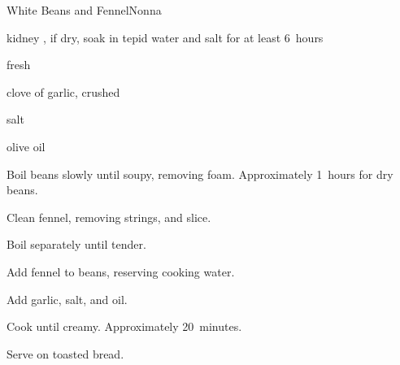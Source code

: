 \begin{recipe}{White Beans and Fennel}{Nonna}{}

\begin{ingredients}
\item kidney , if dry, soak in tepid water and salt for at least 6~hours
\item fresh 
\item clove of garlic, crushed
\item salt
\item olive oil
\end{ingredients}

\begin{directions}
\item Boil beans slowly until soupy, removing foam. Approximately 1\half~hours for dry beans.
\item Clean fennel, removing strings, and slice.
\item Boil separately until tender.
\item Add fennel to beans, reserving cooking water.
\item Add garlic, salt, and oil.
\item Cook until creamy. Approximately 20~minutes.
\item Serve on toasted bread.
\end{directions}

\end{recipe}
